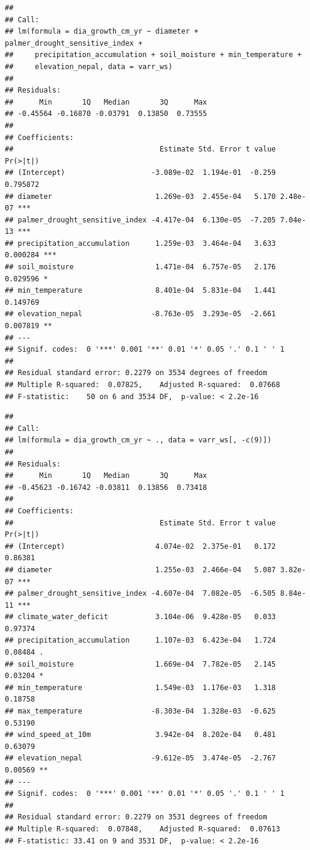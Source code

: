 \documentclass[
]{article}
\begin{document}
\begin{verbatim}
## 
## Call:
## lm(formula = dia_growth_cm_yr ~ diameter + palmer_drought_sensitive_index + 
##     precipitation_accumulation + soil_moisture + min_temperature + 
##     elevation_nepal, data = varr_ws)
## 
## Residuals:
##      Min       1Q   Median       3Q      Max 
## -0.45564 -0.16870 -0.03791  0.13850  0.73555 
## 
## Coefficients:
##                                  Estimate Std. Error t value Pr(>|t|)    
## (Intercept)                    -3.089e-02  1.194e-01  -0.259 0.795872    
## diameter                        1.269e-03  2.455e-04   5.170 2.48e-07 ***
## palmer_drought_sensitive_index -4.417e-04  6.130e-05  -7.205 7.04e-13 ***
## precipitation_accumulation      1.259e-03  3.464e-04   3.633 0.000284 ***
## soil_moisture                   1.471e-04  6.757e-05   2.176 0.029596 *  
## min_temperature                 8.401e-04  5.831e-04   1.441 0.149769    
## elevation_nepal                -8.763e-05  3.293e-05  -2.661 0.007819 ** 
## ---
## Signif. codes:  0 '***' 0.001 '**' 0.01 '*' 0.05 '.' 0.1 ' ' 1
## 
## Residual standard error: 0.2279 on 3534 degrees of freedom
## Multiple R-squared:  0.07825,    Adjusted R-squared:  0.07668 
## F-statistic:    50 on 6 and 3534 DF,  p-value: < 2.2e-16
\end{verbatim}

\begin{verbatim}
## 
## Call:
## lm(formula = dia_growth_cm_yr ~ ., data = varr_ws[, -c(9)])
## 
## Residuals:
##      Min       1Q   Median       3Q      Max 
## -0.45623 -0.16742 -0.03811  0.13856  0.73418 
## 
## Coefficients:
##                                  Estimate Std. Error t value Pr(>|t|)    
## (Intercept)                     4.074e-02  2.375e-01   0.172  0.86381    
## diameter                        1.255e-03  2.466e-04   5.087 3.82e-07 ***
## palmer_drought_sensitive_index -4.607e-04  7.082e-05  -6.505 8.84e-11 ***
## climate_water_deficit           3.104e-06  9.428e-05   0.033  0.97374    
## precipitation_accumulation      1.107e-03  6.423e-04   1.724  0.08484 .  
## soil_moisture                   1.669e-04  7.782e-05   2.145  0.03204 *  
## min_temperature                 1.549e-03  1.176e-03   1.318  0.18758    
## max_temperature                -8.303e-04  1.328e-03  -0.625  0.53190    
## wind_speed_at_10m               3.942e-04  8.202e-04   0.481  0.63079    
## elevation_nepal                -9.612e-05  3.474e-05  -2.767  0.00569 ** 
## ---
## Signif. codes:  0 '***' 0.001 '**' 0.01 '*' 0.05 '.' 0.1 ' ' 1
## 
## Residual standard error: 0.2279 on 3531 degrees of freedom
## Multiple R-squared:  0.07848,    Adjusted R-squared:  0.07613 
## F-statistic: 33.41 on 9 and 3531 DF,  p-value: < 2.2e-16
\end{verbatim}
\end{document}
